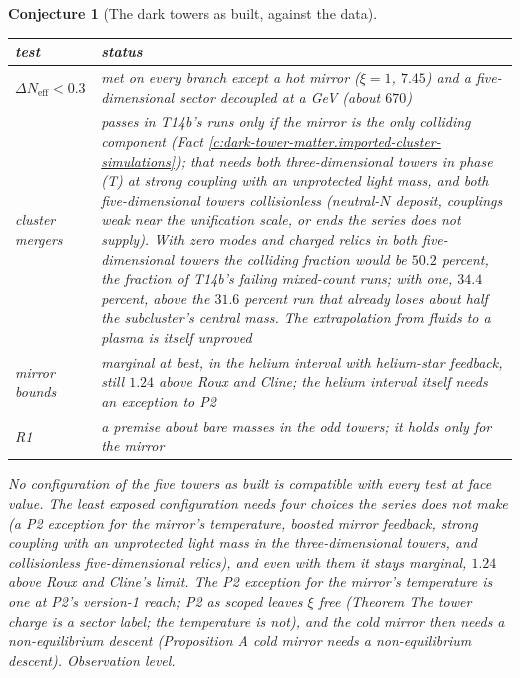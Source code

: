 \documentclass[11pt]{article}
\newtheorem{conjecture}[theorem]{Conjecture}
\theoremstyle{definition}
\theoremstyle{plain}
\newcommand{\changedmark}[2]{\marginpar{\raggedright\scriptsize\color{#1}#2}}
\providecommand{\Neff}{}\renewcommand{\Neff}{N_{\mathrm{eff}}}
\begin{document}
\begin{conjecture}[The dark towers as built, against the data]\label{c:dark-tower-matter.towers-built}
\changedmark{BurntOrange}{changed since the deposit}
\begin{center}\small
\begin{tabular}{@{}p{3.6cm}p{10.2cm}@{}}
\toprule
test & status \\
\midrule
$\Delta\Neff < 0.3$ & met on every branch except a hot mirror ($\xi = 1$, $7.45$) and a five-dimensional sector decoupled at a GeV (about $670$) \\
cluster mergers & passes in T14b's runs only if the mirror is the only colliding component (Fact \ref{c:dark-tower-matter.imported-cluster-simulations}); that needs both three-dimensional towers in phase (T) at strong coupling with an unprotected light mass, and both five-dimensional towers collisionless (neutral-$N$ deposit, couplings weak near the unification scale, or ends the series does not supply). With zero modes and charged relics in both five-dimensional towers the colliding fraction would be $50.2$ percent, the fraction of T14b's failing mixed-count runs; with one, $34.4$ percent, above the $31.6$ percent run that already loses about half the subcluster's central mass. The extrapolation from fluids to a plasma is itself unproved \\
mirror bounds & marginal at best, in the helium interval with helium-star feedback, still $1.24$ above Roux and Cline; the helium interval itself needs an exception to P2 \\
R1 & a premise about bare masses in the odd towers; it holds only for the mirror \\
\bottomrule
\end{tabular}
\end{center}
No configuration of the five towers as built is compatible with every test at face value. The least exposed configuration needs four choices the series does not make (a P2 exception for the mirror's temperature, boosted mirror feedback, strong coupling with an unprotected light mass in the three-dimensional towers, and collisionless five-dimensional relics), and even with them it stays marginal, $1.24$ above Roux and Cline's limit. The P2 exception for the mirror's temperature is one at P2's version-1 reach; P2 as scoped leaves $\xi$ free (Theorem \emph{The tower charge is a sector label; the temperature is not}), and the cold mirror then needs a non-equilibrium descent (Proposition \emph{A cold mirror needs a non-equilibrium descent}). Observation level.
\end{conjecture}
\end{document}
